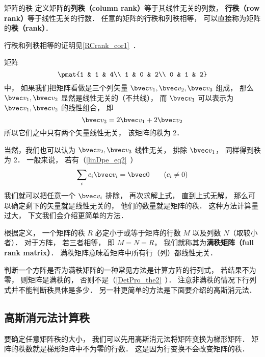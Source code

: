 

\begin{definition}{矩阵的秩}
定义矩阵的\textbf{列秩（column rank）}等于其线性无关的列数， \textbf{行秩（row rank）}等于线性无关的行数． 任意的矩阵的行秩和列秩相等， 可以直接称为矩阵的\textbf{秩（rank）}．
\end{definition}
行秩和列秩相等的证明见\autoref{RCrank_cor1}~．

\begin{example}{}
矩阵
\begin{equation}\label{MatRnk_eq1}
\pmat{1 & 1 & 4\\ 1 & 0 & 2\\ 0 & 1 & 2}
\end{equation}
中， 如果我们把矩阵看做是三个列矢量 $\bvec v_1, \bvec v_2, \bvec v_3$ 组成， 那么 $\bvec v_1, \bvec v_2$ 显然是线性无关的（不共线）， 而 $\bvec v_3$ 可以表示为 $\bvec v_1, \bvec v_2$ 的线性组合， 即
\begin{equation}
\bvec v_3 = 2\bvec v_1 + 2\bvec v_2
\end{equation}
所以它们之中只有两个矢量线性无关， 该矩阵的秩为 2．

当然，我们也可以认为 $\bvec v_2, \bvec v_3$ 线性无关， 排除 $\bvec v_1$， 同样得到秩为 2． 一般来说， 若有（\autoref{linDpe_eq2}~）
\begin{equation}
\sum_i c_i \bvec v_i = \bvec 0 \qquad (c_i \ne 0)
\end{equation}
我们就可以把任意一个 $\bvec v_i$ 排除， 再次求解上式， 直到上式无解， 那么可以确定剩下的矢量就是线性无关的， 他们的数量就是矩阵的秩． 这种方法计算量过大， 下文我们会介绍更简单的方法．
\end{example}

根据定义， 一个矩阵的秩 $R$ 必定小于或等于矩阵的行数 $M$ 以及列数 $N$（取较小者）． 对于方阵， 若三者相等， 即 $M = N = R$， 我们就称其为\textbf{满秩矩阵（full rank matrix）}． 满秩矩阵意味着矩阵中所有行（列）都线性无关．

判断一个方阵是否为满秩矩阵的一种常见方法是计算方阵的行列式， 若结果不为零， 则矩阵是满秩的， 否则不是（\autoref{DetPro_the2}~）． 注意非满秩的情况下行列式并不能判断秩具体是多少． 另一种更简单的方法是下面要介绍的高斯消元法．

\subsection{高斯消元法计算秩}
要确定任意矩阵秩的大小， 我们可以先用高斯消元法将矩阵变换为梯形矩阵． 矩阵的秩数就是梯形矩阵中不为零的行数． 这是因为行变换不会改变矩阵的秩．

